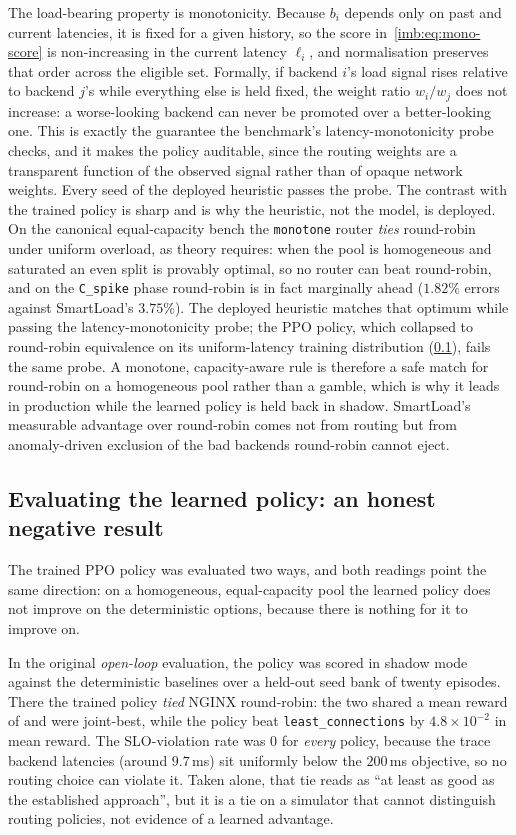 The load-bearing property is monotonicity. Because $b_i$ depends only on past and
current latencies, it is fixed for a given history, so the score
in~\cref{imb:eq:mono-score} is non-increasing in the current latency $\ell_i$, and
normalisation preserves that order across the eligible set. Formally, if backend
$i$'s load signal rises relative to backend $j$'s while everything else is held
fixed, the weight ratio $w_i/w_j$ does not increase: a worse-looking backend can
never be promoted over a better-looking one. This is exactly the guarantee the
benchmark's latency-monotonicity probe checks, and it makes the policy auditable,
since the routing weights are a transparent function of the observed signal rather
than of opaque network weights. Every seed of the deployed heuristic passes the
probe. The contrast with the trained policy is sharp and is why the heuristic, not
the model, is deployed. On the canonical equal-capacity bench the \texttt{monotone}
router \emph{ties} round-robin under uniform overload, as theory requires: when the pool
is homogeneous and saturated an even split is provably optimal, so no router can beat
round-robin, and on the \texttt{C\_spike} phase round-robin is in fact marginally ahead
($1.82\%$ errors against SmartLoad's $3.75\%$). The deployed heuristic matches that
optimum while passing the latency-monotonicity probe; the PPO policy, which collapsed to
round-robin equivalence on its uniform-latency training distribution
(\cref{imb:ppo_finding}), fails the same probe. A monotone, capacity-aware rule is
therefore a safe match for round-robin on a homogeneous pool rather than a gamble, which
is why it leads in production while the learned policy is held back in shadow.
SmartLoad's measurable advantage over round-robin comes not from routing but from
anomaly-driven exclusion of the bad backends round-robin cannot eject.

\subsection{Evaluating the learned policy: an honest negative result}\label{imb:ppo_finding}

The trained PPO policy was evaluated two ways, and both readings point the same
direction: on a homogeneous, equal-capacity pool the learned policy does not improve on
the deterministic options, because there is nothing for it to improve on.

In the original \emph{open-loop} evaluation, the policy was scored in shadow mode
against the deterministic baselines over a held-out seed bank of twenty episodes.
There the trained policy \emph{tied} NGINX round-robin: the two shared a mean
reward of \BMrlPpoReward{} and were joint-best, while the policy beat
\texttt{least\_connections} by $4.8\times10^{-2}$ in mean reward. The SLO-violation
rate was $0$ for \emph{every} policy, because the trace backend latencies (around
$9.7$\,ms) sit uniformly below the $200$\,ms objective, so no routing choice can
violate it. Taken alone, that tie reads as ``at least as good as the established
approach'', but it is a tie on a simulator that cannot distinguish routing
policies, not evidence of a learned advantage.

